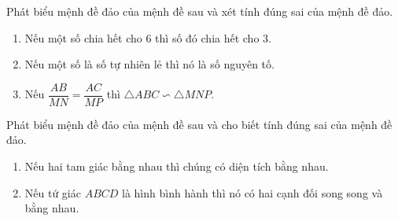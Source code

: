 \begin{bt}
	Phát biểu mệnh đề đảo của mệnh đề sau và xét tính đúng sai của mệnh đề đảo.
	\begin{enumerate}
		\item Nếu một số chia hết cho $6$ thì số đó chia hết cho $3$.
		\item Nếu một số là số tự nhiên lẻ thì nó là số nguyên tố.
		\item Nếu $\dfrac{AB}{MN}=\dfrac{AC}{MP}$ thì $\triangle ABC\backsim \triangle MNP$.
	\end{enumerate}
\end{bt}

\begin{bt}
	Phát biểu mệnh đề đảo của mệnh đề sau và cho biết tính đúng sai của mệnh đề đảo.
	\begin{enumerate}
		\item Nếu hai tam giác bằng nhau thì chúng có diện tích bằng nhau.
		\item Nếu tứ giác $ABCD$ là hình bình hành thì nó có hai cạnh đối song song và bằng nhau.
	\end{enumerate}
\end{bt}

